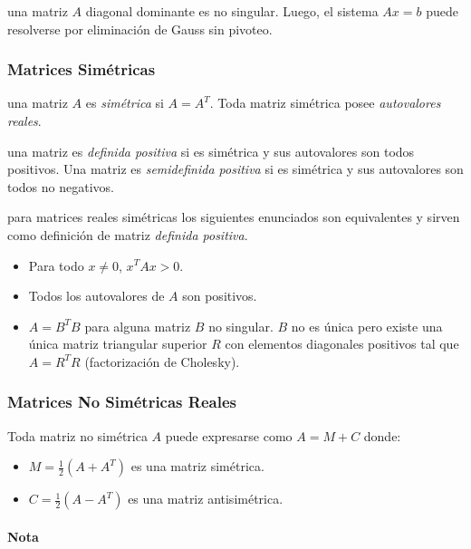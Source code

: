 \Teorema una matriz \(A\) diagonal dominante es no singular. Luego, el
sistema \(Ax=b\) puede resolverse por eliminación de Gauss sin pivoteo.

\hypertarget{matrices-simuxe9tricas}{%
\subsubsection{Matrices Simétricas}\label{matrices-simuxe9tricas}}

\Definicion una matriz \(A\) es \emph{simétrica} si \(A = A^T\). Toda
matriz simétrica posee \emph{autovalores reales}.

\Definicion una matriz es \emph{definida positiva} si es simétrica y sus
autovalores son todos positivos. Una matriz es \emph{semidefinida
positiva} si es simétrica y sus autovalores son todos no negativos.

\Teorema para matrices reales simétricas los siguientes enunciados son
equivalentes y sirven como definición de matriz \emph{definida
positiva}.

\begin{itemize}
\tightlist
\item
  Para todo \(x \neq 0\), \(x^T A x > 0\).
\item
  Todos los autovalores de \(A\) son positivos.
\item
  \(A = B^T B\) para alguna matriz \(B\) no singular. \(B\) no es única
  pero existe una única matriz triangular superior \(R\) con elementos
  diagonales positivos tal que \(A = R^T R\) (factorización de
  Cholesky).
\end{itemize}

\hypertarget{matrices-no-simuxe9tricas-reales}{%
\subsubsection{Matrices No Simétricas
Reales}\label{matrices-no-simuxe9tricas-reales}}

Toda matriz no simétrica \(A\) puede expresarse como \(A = M + C\)
donde:

\begin{itemize}
\tightlist
\item
  \(M = \frac{1}{2} (A + A^T)\) es una matriz simétrica.
\item
  \(C = \frac{1}{2} (A - A^T)\) es una matriz antisimétrica.
\end{itemize}

\hypertarget{nota}{%
\paragraph{Nota}\label{nota}}

